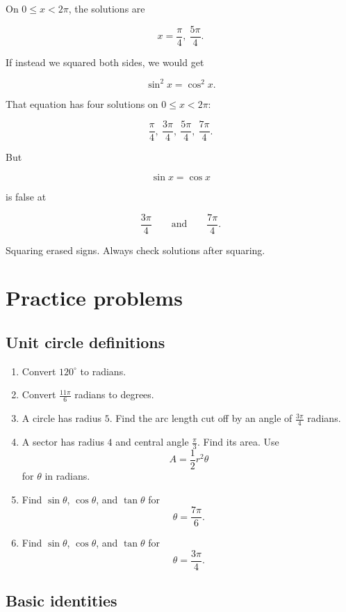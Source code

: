 On \(0\le x<2\pi\), the solutions are

\[
\boxed{
x=\frac{\pi}{4},\ \frac{5\pi}{4}.
}
\]

If instead we squared both sides, we would get

\[
\sin^2 x=\cos^2 x.
\]

That equation has four solutions on \(0\le x<2\pi\):

\[
\frac{\pi}{4},\ \frac{3\pi}{4},\ \frac{5\pi}{4},\ \frac{7\pi}{4}.
\]

But

\[
\sin x=\cos x
\]

is false at

\[
\frac{3\pi}{4}
\qquad\text{and}\qquad
\frac{7\pi}{4}.
\]

Squaring erased signs.  Always check solutions after squaring.

\section{Practice problems}
\label{appsec:trig-practice-problems}

\subsection*{Unit circle definitions}

\begin{enumerate}
\item Convert \(120^\circ\) to radians.

\item Convert \(\frac{11\pi}{6}\) radians to degrees.

\item A circle has radius \(5\).  Find the arc length cut off by an angle of
\(\frac{3\pi}{4}\) radians.

\item A sector has radius \(4\) and central angle \(\frac{\pi}{3}\).  Find its area.
Use
\[
A=\frac12 r^2\theta
\]
for \(\theta\) in radians.

\item Find \(\sin\theta\), \(\cos\theta\), and \(\tan\theta\) for
\[
\theta=\frac{7\pi}{6}.
\]

\item Find \(\sin\theta\), \(\cos\theta\), and \(\tan\theta\) for
\[
\theta=\frac{3\pi}{4}.
\]
\end{enumerate}

\subsection*{Basic identities}

